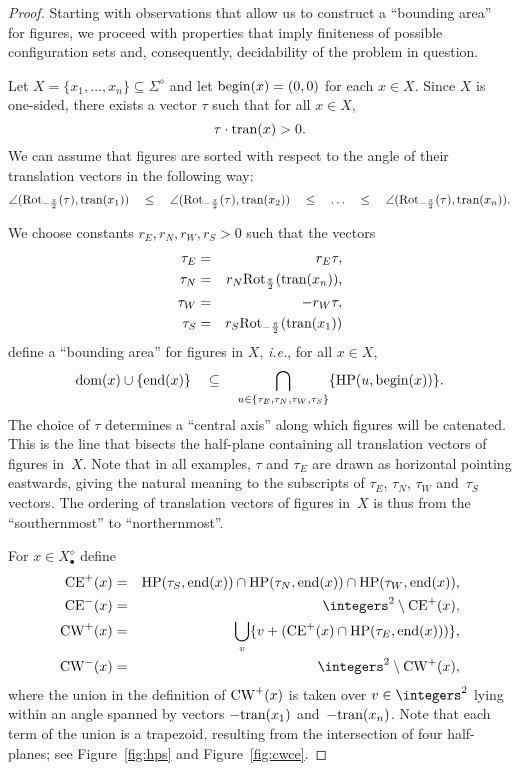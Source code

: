 \documentclass[final,nomarks]{dmtcs-episciences}
\newcommand{\dfplus}[1]{#1^{\diamond}}
\newcommand{\DFX}[1]{#1^{\diamond}_{\bullet}}
\newcommand{\dfbegin}[1]{\mbox{\rm begin}(#1)}
\newcommand{\dfend}[1]{\mbox{\rm end}(#1)}
\newcommand{\dftransition}[1]{\mbox{\rm tran}(#1)}
\newcommand{\dfdomain}[1]{\mbox{\rm dom}(#1)}
\newcommand{\CEP}[1]{\mbox{\rm CE}^+(#1)}\newcommand{\CEN}[1]{\mbox{\rm CE}^-(#1)}\newcommand{\CWP}[1]{\mbox{\rm CW}^+(#1)}\newcommand{\CWN}[1]{\mbox{\rm CW}^-(#1)}\newcommand{\B}[2]{\mbox{\rm B}(#1,#2)}\newcommand{\HP}[2]{\mbox{\rm HP}(#1,#2)}\newcommand{\R}[2]{\mbox{\rm Rot}_{#1}(#2)}\newcommand{\tr}[1]{\mathrm{tr}_{#1}}
\begin{document}
\begin{proof}
Starting with observations that allow us to
construct a ``bounding area'' for figures, we proceed with
properties that imply finiteness of possible configuration sets and,
consequently, decidability of the problem in question.

Let $X=\{x_1,\ldots,x_n\}\subseteq\dfplus{\Sigma}$ and let
$\dfbegin{x}=(0,0)$ for each $x\in X$. Since $X$ is one-sided,
there exists a vector $\tau$ such that for all $x\in X$,
\begin{displaymath}
\tau\cdot\dftransition{x}>0.
\end{displaymath}
We can assume that figures are sorted with respect to the angle of their translation
vectors in the following way:
\begin{displaymath}
\angle(\R{-\frac{\pi}{2}}{\tau},\dftransition{x_1}) ~~~\leq~~~
\angle(\R{-\frac{\pi}{2}}{\tau},\dftransition{x_2}) ~~~\leq~~~\ldots~~~\leq~~~
\angle(\R{-\frac{\pi}{2}}{\tau},\dftransition{x_n}).
\end{displaymath}

We choose constants $r_E,r_N,r_W,r_S > 0$ such that the vectors
\begin{eqnarray*}
\tau_E &=& r_E\tau,\\
\tau_N &=& r_N \R{\frac{\pi}{2}}{\dftransition{x_n}},\\
\tau_W &=& -r_W\tau,\\
\tau_S &=& r_S \R{-\frac{\pi}{2}}{\dftransition{x_1}}
\end{eqnarray*}
define a ``bounding area'' for figures in $X$, \textit{i.e.}, for all $x\in X$,
\begin{displaymath}
   \dfdomain{x}\cup\{\dfend{x}\}~~~\subseteq~~~
   \bigcap_{u \in\{\tau_E,\tau_N,\tau_W,\tau_S\}}\{\HP{u}{\dfbegin{x}}\}.
\end{displaymath}
The choice of $\tau$ determines a ``central axis'' along which figures will be
catenated. This is the line that bisects the half-plane containing all translation
vectors of figures in~$X$. Note that in all examples, $\tau$ and  $\tau_E$ are drawn 
as horizontal pointing eastwards, giving the natural meaning to the subscripts of  
$\tau_E$, $\tau_N$, $\tau_W$ and~$\tau_S$ vectors. The ordering of translation vectors
of figures in~$X$ is thus from the ``southernmost'' to ``northernmost''.

For $x\in\DFX{X}$ define
\begin{eqnarray*}
\CEP{x} &=& \HP{\tau_S}{\dfend{x}}\cap\HP{\tau_N}{\dfend{x}}\cap\HP{\tau_W}{\dfend{x}},\\
\CEN{x} &=& \integers^2\setminus\CEP{x},\\
\CWP{x} &=& \bigcup_{v}\{v+(\CEP{x}\cap\HP{\tau_E}{\dfend{x}})\},\\
\CWN{x} &=& \integers^2\setminus\CWP{x},
\end{eqnarray*}
where the union in the definition of $\CWP{x}$ is taken over $v\in\integers^2$ 
lying within an angle
spanned by vectors $-\dftransition{x_1}$ and~$-\dftransition{x_n}$.
Note that each term of the union is a trapezoid, resulting from the intersection
of four half-planes; see Figure~\ref{fig:hps} and Figure~\ref{fig:cwce}.


\end{proof}
\end{document}
